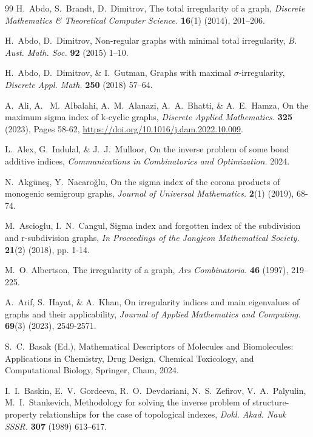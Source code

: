 \documentclass[12pt, a4paper]{article}
\begin{document}
\begin{thebibliography}{99}
 H.~Abdo, S.~Brandt, D.~Dimitrov, The total irregularity of a graph, {\em Discrete Mathematics \& Theoretical Computer Science.}  \textbf{16}(1) (2014), 201–206.

 H.~Abdo, D.~Dimitrov, Non-regular graphs with minimal total irregularity, {\em B. Aust. Math. Soc.} \textbf{92} (2015) 1–10.


 H.~Abdo, D.~Dimitrov, \& I.~Gutman, Graphs with maximal $\sigma$-irregularity, {\em Discrete Appl. Math.} \textbf{250} (2018) 57–64.


 A.~Ali, A.~ M.~Albalahi, A.~M.~Alanazi, A.~A.~Bhatti, \& A.~E.~Hamza, On the maximum sigma index of k-cyclic graphs, {\em Discrete Applied Mathematics.} \textbf{325} (2023), Pages 58-62, \url{https://doi.org/10.1016/j.dam.2022.10.009}.


 L.~Alex, G.~Indulal, \& J.~J.~Mulloor, On the inverse problem of some bond additive indices, {\em Communications in Combinatorics and Optimization.} 2024.

 N.~Akgüneş, Y.~Nacaroğlu, On the sigma index of the corona products of monogenic semigroup graphs, {\em Journal of Universal Mathematics.} \textbf{2}(1) (2019), 68-74.

 M.~Ascioglu, I.~N.~Cangul, Sigma index and forgotten index of the subdivision and r-subdivision graphs, {\em In Proceedings of the Jangjeon Mathematical Society.} \textbf{21}(2) (2018), pp. 1-14.

M.~O. Albertson, The irregularity of a graph, {\em Ars Combinatoria.} \textbf{46} (1997), 219–225.

 A.~Arif, S.~Hayat, \& A.~Khan, On irregularity indices and main eigenvalues of graphs and their applicability, {\em Journal of Applied Mathematics and Computing.} \textbf{69}(3) (2023), 2549-2571.



 S.~C.~Basak (Ed.), Mathematical Descriptors of Molecules and Biomolecules: Applications in Chemistry, Drug Design, Chemical Toxicology, and Computational Biology, Springer, Cham, 2024.

 I.~I.~Baskin, E.~V.~Gordeeva, R.~O.~Devdariani, N.~S.~Zefirov, V.~A.~Palyulin, M.~I.~Stankevich, Methodology for solving the inverse problem of structure-property relationships for the case of topological indexes, {\em Dokl. Akad. Nauk SSSR.} \textbf{307} (1989) 613–617.


\end{thebibliography}
\end{document}
